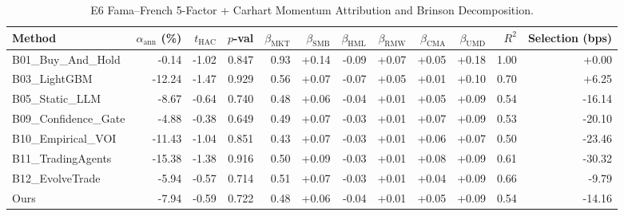 \begin{table}[t]
\centering
\caption{E6 Fama--French 5-Factor + Carhart Momentum Attribution and Brinson Decomposition.}
\label{tab:e6_factor_attribution}
\footnotesize
\setlength{\tabcolsep}{3.5pt}
\begin{tabular}{lrrrrrrrrrrr}
\toprule
Method & $\alpha_{\text{ann}}$ (\%) & $t_{\text{HAC}}$ & $p$-val & $\beta_{\text{MKT}}$ & $\beta_{\text{SMB}}$ & $\beta_{\text{HML}}$ & $\beta_{\text{RMW}}$ & $\beta_{\text{CMA}}$ & $\beta_{\text{UMD}}$ & $R^2$ & Selection (bps) \\
\midrule
B01\_Buy\_And\_Hold & -0.14 & -1.02 & 0.847 & 0.93 & +0.14 & -0.09 & +0.07 & +0.05 & +0.18 & 1.00 & +0.00 \\
B03\_LightGBM & -12.24 & -1.47 & 0.929 & 0.56 & +0.07 & -0.07 & +0.05 & +0.01 & +0.10 & 0.70 & +6.25 \\
B05\_Static\_LLM & -8.67 & -0.64 & 0.740 & 0.48 & +0.06 & -0.04 & +0.01 & +0.05 & +0.09 & 0.54 & -16.14 \\
B09\_Confidence\_Gate & -4.88 & -0.38 & 0.649 & 0.49 & +0.07 & -0.03 & +0.01 & +0.07 & +0.09 & 0.53 & -20.10 \\
B10\_Empirical\_VOI & -11.43 & -1.04 & 0.851 & 0.43 & +0.07 & -0.03 & +0.01 & +0.06 & +0.07 & 0.50 & -23.46 \\
B11\_TradingAgents & -15.38 & -1.38 & 0.916 & 0.50 & +0.09 & -0.03 & +0.01 & +0.08 & +0.09 & 0.61 & -30.32 \\
B12\_EvolveTrade & -5.94 & -0.57 & 0.714 & 0.51 & +0.07 & -0.03 & +0.01 & +0.04 & +0.09 & 0.66 & -9.79 \\
Ours & -7.94 & -0.59 & 0.722 & 0.48 & +0.06 & -0.04 & +0.01 & +0.05 & +0.09 & 0.54 & -14.16 \\
\bottomrule
\end{tabular}
\end{table}
